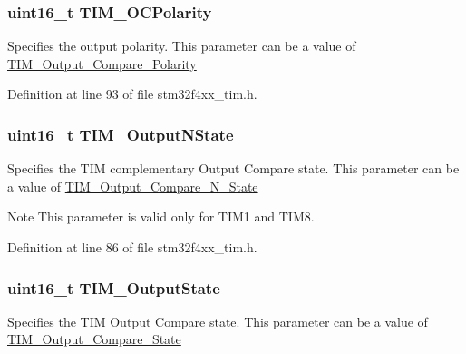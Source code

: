 \hypertarget{struct_t_i_m___o_c_init_type_def_acc7066b59671f62f2696c382c879c9c8}{
\subsubsection[{T\-I\-M\-\_\-\-O\-C\-Polarity}]{\setlength{\rightskip}{0pt plus 5cm}uint16\-\_\-t T\-I\-M\-\_\-\-O\-C\-Polarity}}\label{struct_t_i_m___o_c_init_type_def_acc7066b59671f62f2696c382c879c9c8}
Specifies the output polarity. This parameter can be a value of \hyperlink{group___t_i_m___output___compare___polarity}{T\-I\-M\-\_\-\-Output\-\_\-\-Compare\-\_\-\-Polarity} 

Definition at line 93 of file stm32f4xx\-\_\-tim.\-h.

\hypertarget{struct_t_i_m___o_c_init_type_def_a74a30f1a994c6676c0ce2b56243ed184}{
\subsubsection[{T\-I\-M\-\_\-\-Output\-N\-State}]{\setlength{\rightskip}{0pt plus 5cm}uint16\-\_\-t T\-I\-M\-\_\-\-Output\-N\-State}}\label{struct_t_i_m___o_c_init_type_def_a74a30f1a994c6676c0ce2b56243ed184}
Specifies the T\-I\-M complementary Output Compare state. This parameter can be a value of \hyperlink{group___t_i_m___output___compare___n___state}{T\-I\-M\-\_\-\-Output\-\_\-\-Compare\-\_\-\-N\-\_\-\-State} \begin{DoxyNote}{Note}
This parameter is valid only for T\-I\-M1 and T\-I\-M8. 
\end{DoxyNote}


Definition at line 86 of file stm32f4xx\-\_\-tim.\-h.

\hypertarget{struct_t_i_m___o_c_init_type_def_a1e88e3081574da1e1abc089df87985ba}{
\subsubsection[{T\-I\-M\-\_\-\-Output\-State}]{\setlength{\rightskip}{0pt plus 5cm}uint16\-\_\-t T\-I\-M\-\_\-\-Output\-State}}\label{struct_t_i_m___o_c_init_type_def_a1e88e3081574da1e1abc089df87985ba}
Specifies the T\-I\-M Output Compare state. This parameter can be a value of \hyperlink{group___t_i_m___output___compare___state}{T\-I\-M\-\_\-\-Output\-\_\-\-Compare\-\_\-\-State} 

